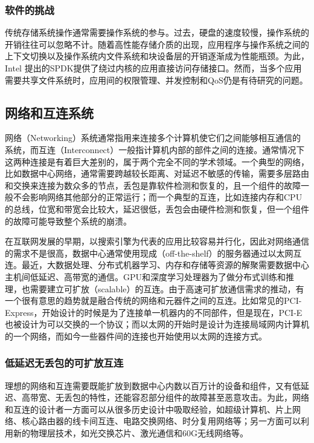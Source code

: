 \subsubsection{软件的挑战}

传统存储系统操作通常需要操作系统的参与。过去，硬盘的速度较慢，操作系统的开销往往可以忽略不计。随着高性能存储介质的出现，应用程序与操作系统之间的上下文切换以及操作系统内文件系统和块设备层的开销逐渐成为性能瓶颈。为此，Intel 提出的SPDK提供了绕过内核的应用直接访问存储接口。然而，当多个应用需要共享文件系统时，应用间的权限管理、并发控制和QoS仍是有待研究的问题。

\subsection{网络和互连系统}

网络（Networking）系统通常指用来连接多个计算机使它们之间能够相互通信的系统，而互连（Interconnect）一般指计算机内部的部件之间的连接。通常情况下这两种连接是有着巨大差别的，属于两个完全不同的学术领域。一个典型的网络，比如数据中心网络，通常需要跨越较长距离、对延迟不敏感的传输，需要多层路由和交换来连接为数众多的节点，丢包是靠软件检测和恢复的，且一个组件的故障一般不会影响网络其他部分的正常运行；而一个典型的互连，比如连接内存和CPU的总线，位宽和带宽会比较大，延迟很低，丢包会由硬件检测和恢复，但一个组件的故障可能导致整个系统的崩溃。

在互联网发展的早期，以搜索引擎为代表的应用比较容易并行化，因此对网络通信的需求不是很高，数据中心通常使用现成（off-the-shelf）的服务器通过以太网互连。最近，大数据处理、分布式机器学习、内存和存储等资源的解聚需要数据中心主机间低延迟、高带宽的通信。GPU和深度学习处理器为了做分布式训练和推理，也需要建立可扩放（scalable）的互连。由于高速可扩放通信需求的推动，有一个很有意思的趋势就是融合传统的网络和元器件之间的互连。比如常见的PCI-Express，开始设计的时候是为了连接单一机器内的不同部件，但是现在，PCI-E也被设计为可以交换的一个协议；而以太网的开始时是设计为连接局域网内计算机的一个网络，而如今一些器件间的连接也开始使用以太网的连接方式。

\subsubsection{低延迟无丢包的可扩放互连}

理想的网络和互连需要既能扩放到数据中心内数以百万计的设备和组件，又有低延迟、高带宽、无丢包的特性，还能容忍部分组件的故障甚至恶意攻击。为此，网络和互连的设计者一方面可以从很多历史设计中吸取经验，如超级计算机、片上网络、核心路由器的线卡间互连、电路交换网络、时分复用网络等；另一方面可以利用新的物理层技术，如光交换芯片、激光通信和60G无线网络等。

